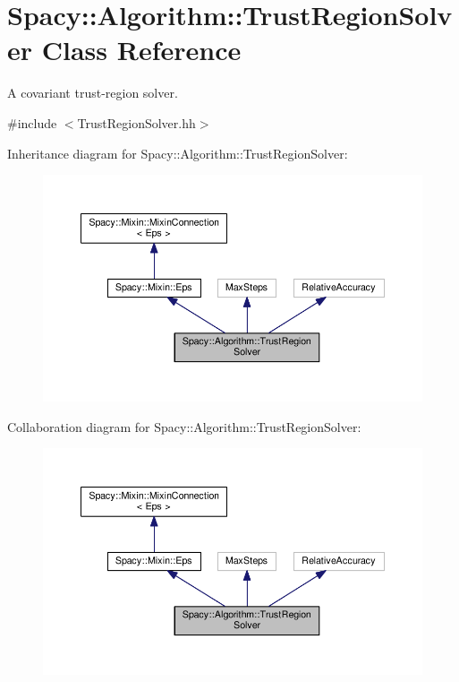 \hypertarget{classSpacy_1_1Algorithm_1_1TrustRegionSolver}{\section{Spacy\-:\-:Algorithm\-:\-:Trust\-Region\-Solver Class Reference}
\label{classSpacy_1_1Algorithm_1_1TrustRegionSolver}
}


A covariant trust-\/region solver.  




{\ttfamily \#include $<$Trust\-Region\-Solver.\-hh$>$}



Inheritance diagram for Spacy\-:\-:Algorithm\-:\-:Trust\-Region\-Solver\-:
\nopagebreak
\begin{figure}[H]
\begin{center}
\leavevmode
\includegraphics[width=350pt]{classSpacy_1_1Algorithm_1_1TrustRegionSolver__inherit__graph}
\end{center}
\end{figure}


Collaboration diagram for Spacy\-:\-:Algorithm\-:\-:Trust\-Region\-Solver\-:
\nopagebreak
\begin{figure}[H]
\begin{center}
\leavevmode
\includegraphics[width=350pt]{classSpacy_1_1Algorithm_1_1TrustRegionSolver__coll__graph}
\end{center}
\end{figure}
